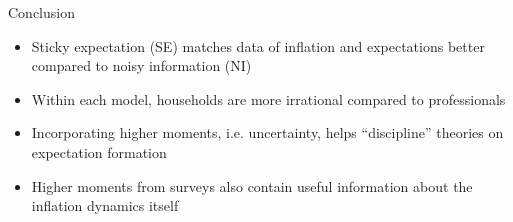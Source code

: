 \documentclass{beamer}
\begin{document}
\begin{frame}{Conclusion}
	\begin{itemize}
		\item Sticky expectation (SE) matches data of inflation and expectations better compared to noisy information (NI) 
		\item Within each model,  households are more irrational compared to professionals
		\item Incorporating higher moments, i.e. uncertainty,  helps ``discipline'' theories on expectation formation
		\item  Higher moments from surveys also contain useful information about the inflation dynamics itself
	\end{itemize}	
\end{frame}



\end{document}
